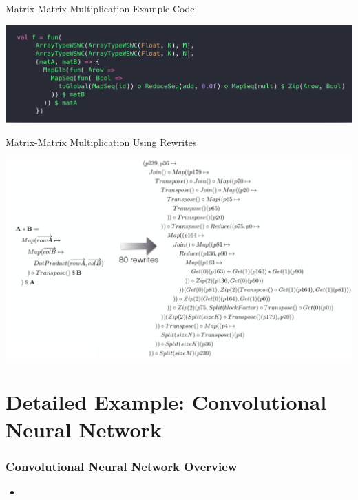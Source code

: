 \documentclass[10pt]{beamer}
\begin{document}
\begin{frame}{Matrix-Matrix Multiplication Example Code}
        \begin{block}{}
        \begin{center}
            \includegraphics[width=\textwidth]{../images/matrixMatrix.png}
        \end{center}
        \end{block}
\end{frame}

\begin{frame}{Matrix-Matrix Multiplication Using Rewrites}
        \begin{block}{}
        \begin{center}
            \includegraphics[width=\textwidth]{../images/matrixRewrites.pdf}
        \end{center}
        \end{block}
\end{frame}


\section{Detailed Example: Convolutional Neural Network }

\begin{frame}
\frametitle{Convolutional Neural Network Overview}
\vspace{.2cm}
\begin{itemize}
    \item 
\end{itemize}
\vspace{-1.2cm}
\end{frame}
\end{document}
